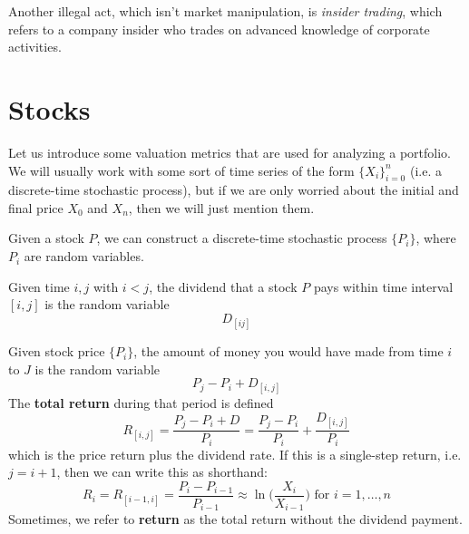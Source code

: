 \documentclass{article}
\begin{document}
    Another illegal act, which isn't market manipulation, is \textit{insider trading}, which refers to a company insider who trades on advanced knowledge of corporate activities. 

\section{Stocks}

    Let us introduce some valuation metrics that are used for analyzing a portfolio. We will usually work with some sort of time series of the form $\{X_i\}_{i=0}^n$ (i.e. a discrete-time stochastic process), but if we are only worried about the initial and final price $X_0$ and $X_n$, then we will just mention them. 

    \begin{definition}
      Given a stock $P$, we can construct a discrete-time stochastic process $\{P_i\}$, where $P_i$ are random variables. 
    \end{definition}

    \begin{definition}[Dividend]
      Given time $i, j$ with $i < j$, the dividend that a stock $P$ pays within time interval $[i, j]$ is the random variable 
      \[D_{[i j]}\]
    \end{definition}

    \begin{definition}
      Given stock price $\{P_i\}$, the amount of money you would have made from time $i$ to $J$ is the random variable 
      \[P_j - P_i + D_{[i, j]}\]
      The \textbf{total return} during that period is defined 
      \[R_{[i, j]} = \frac{P_j - P_i + D}{P_i} = \frac{P_j - P_i}{P_i} + \frac{D_{[i, j]}}{P_i}\]
      which is the price return plus the dividend rate. If this is a single-step return, i.e. $j = i + 1$, then we can write this as shorthand: 
      \[R_{i} = R_{[i-1, i]} = \frac{P_i - P_{i-1}}{P_{i-1}} \approx \ln\bigg( \frac{X_i}{X_{i-1}} \bigg) \text{ for } i = 1, \ldots, n\]
      Sometimes, we refer to \textbf{return} as the total return without the dividend payment. 
    \end{definition}
\end{document}
